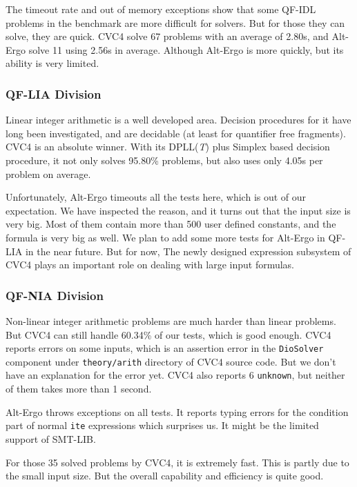 \documentclass[10pt,letter]{article}
\theoremstyle{definition}
\begin{document}
The timeout rate and out of memory exceptions show that some QF-IDL problems in the benchmark are more difficult for solvers. But for those they can solve, they are quick. CVC4 solve 67 problems with an average of 2.80s, and Alt-Ergo solve 11 using 2.56s in average. Although Alt-Ergo is more quickly, but its ability is very limited.

\subsubsection{QF-LIA Division}

Linear integer arithmetic is a well developed area. Decision procedures for it have long been investigated, and are decidable (at least for quantifier free fragments). CVC4 is an absolute winner. With its DPLL({\it T}) plus Simplex based decision procedure\cite{barrett:cvc4:2011}, it not only solves 95.80\% problems, but also uses only 4.05s per problem on average.

Unfortunately, Alt-Ergo timeouts all the tests here, which is out of our expectation. We have inspected the reason, and it turns out that the input size is very big. Most of them contain more than 500 user defined constants, and the formula is very big as well. We plan to add some more tests for Alt-Ergo in QF-LIA in the near future. But for now, The newly designed expression subsystem of CVC4\cite{barrett:cvc4:2011} plays an important role on dealing with large input formulas.

\subsubsection{QF-NIA Division}

Non-linear integer arithmetic problems are much harder than linear problems. But CVC4 can still handle 60.34\% of our tests, which is good enough. CVC4 reports errors on some inputs, which is an assertion error in the {\tt DioSolver} component under {\tt theory/arith} directory of CVC4 source code. But we don't have an explanation for the error yet. CVC4 also reports 6 {\tt unknown}, but neither of them takes more than 1 second.

Alt-Ergo throws exceptions on all tests. It reports typing errors for the condition part of normal {\tt ite} expressions which surprises us. It might be the limited support of SMT-LIB.

For those 35 solved problems by CVC4, it is extremely fast. This is partly due to the small input size. But the overall capability and efficiency is quite good.
\end{document}
